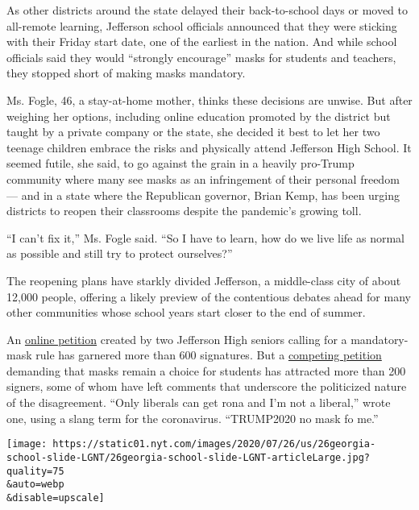 As other districts around the state delayed their back-to-school days or
moved to all-remote learning, Jefferson school officials announced that
they were sticking with their Friday start date, one of the earliest in
the nation. And while school officials said they would ``strongly
encourage'' masks for students and teachers, they stopped short of
making masks mandatory.

Ms. Fogle, 46, a stay-at-home mother, thinks these decisions are unwise.
But after weighing her options, including online education promoted by
the district but taught by a private company or the state, she decided
it best to let her two teenage children embrace the risks and physically
attend Jefferson High School. It seemed futile, she said, to go against
the grain in a heavily pro-Trump community where many see masks as an
infringement of their personal freedom --- and in a state where the
Republican governor, Brian Kemp, has been urging districts to reopen
their classrooms despite the pandemic's growing toll.

``I can't fix it,'' Ms. Fogle said. ``So I have to learn, how do we live
life as normal as possible and still try to protect ourselves?''

The reopening plans have starkly divided Jefferson, a middle-class city
of about 12,000 people, offering a likely preview of the contentious
debates ahead for many other communities whose school years start closer
to the end of summer.

An
\href{https://www.change.org/p/jefferson-board-of-education-mandate-masks-at-jefferson-city-schools}{online
petition} created by two Jefferson High seniors calling for a
mandatory-mask rule has garnered more than 600 signatures. But a
\href{https://www.change.org/p/jefferson-board-of-education-banned-use-of-mask-in-jefferson-city-schools?utm_content=cl_sharecopy_23575435_en-US\%3A3\&recruiter=1133092121\&recruited_by_id=947a76d0-ca11-11ea-be25-252352018b69\&utm_source=share_petition\&utm_medium=copylink\&utm_campaign=psf_combo_share_initial\&utm_term=tap_basic_share}{competing
petition} demanding that masks remain a choice for students has
attracted more than 200 signers, some of whom have left comments that
underscore the politicized nature of the disagreement. ``Only liberals
can get rona and I'm not a liberal,'' wrote one, using a slang term for
the coronavirus. ``TRUMP2020 no mask fo me.''

\texttt{[image: https://static01.nyt.com/images/2020/07/26/us/26georgia-school-slide-LGNT/26georgia-school-slide-LGNT-articleLarge.jpg?quality=75\\\&auto=webp\\\&disable=upscale]}

